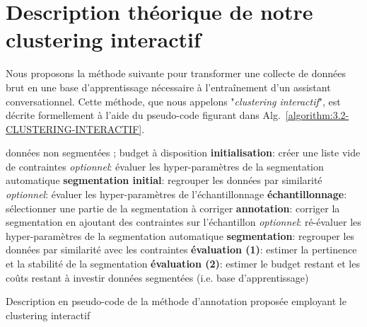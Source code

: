     \section{Description théorique de notre clustering interactif}
	\label{section:3.2-DESCRIPTION-THEORIQUE}
    
		Nous proposons la méthode suivante pour transformer une collecte de données brut en une base d'apprentissage nécessaire à l’entraînement d'un assistant conversationnel. Cette méthode, que nous appelons "\textit{clustering interactif}", est décrite formellement à l'aide du pseudo-code figurant dans Alg.~\ref{algorithm:3.2-CLUSTERING-INTERACTIF}.

		\begin{algorithm}[!htb]
		    \begin{algorithmic}[1]
		        \Require données non segmentées ; budget à disposition
				\State \textbf{initialisation}: créer une liste vide de contraintes
		        \State \textit{optionnel}: évaluer les hyper-paramètres de la segmentation automatique
		        \State \textbf{segmentation initial}: regrouper les données par similarité
		        \Repeat
		            \State \textit{optionnel}: évaluer les hyper-paramètres de l'échantillonnage
		            \State \textbf{échantillonnage}: sélectionner une partie de la segmentation à corriger
		            \State \textbf{annotation}: corriger la segmentation en ajoutant des contraintes sur l'échantillon
		            \State \textit{optionnel}: ré-évaluer les hyper-paramètres de la segmentation automatique
			        \State \textbf{segmentation}: regrouper les données par similarité avec les contraintes
			        \State \textbf{évaluation (1)}: estimer la pertinence et la stabilité de la segmentation
			        \State \textbf{évaluation (2)}: estimer le budget restant et les coûts restant à investir
		        \Ensure données segmentées (i.e. base d'apprentissage)
		    \end{algorithmic}
		    \caption{Description en pseudo-code de la méthode d'annotation proposée employant le clustering interactif}
		    \label{algorithm:3.2-CLUSTERING-INTERACTIF}
		\end{algorithm}
		
